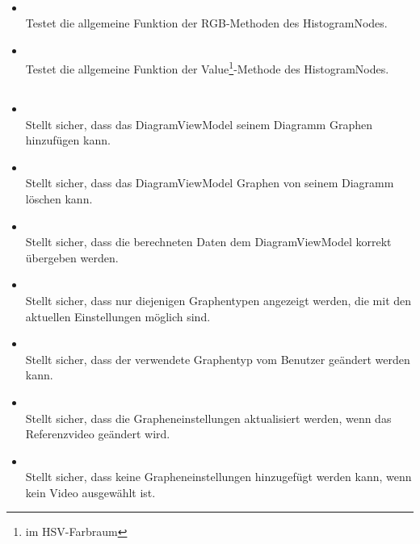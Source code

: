 \paragraph{}
\begin{itemize}
	\item{} \\
		Testet die allgemeine Funktion der RGB-Methoden des HistogramNodes.
	
	\item{} \\
		Testet die allgemeine Funktion der Value\footnote{im HSV-Farbraum}-Methode des HistogramNodes.
\end{itemize}

\subsection{}

\paragraph{}
\begin{itemize}
	\item{} \\
		Stellt sicher, dass das DiagramViewModel seinem Diagramm Graphen hinzufügen kann.
	\item{} \\
		Stellt sicher, dass das DiagramViewModel Graphen von seinem Diagramm löschen kann.
	\item{} \\
		Stellt sicher, dass die berechneten Daten dem DiagramViewModel korrekt übergeben werden.
	\item{} \\
		Stellt sicher, dass nur diejenigen Graphentypen angezeigt werden, die mit den aktuellen Einstellungen möglich sind.
	\item{} \\
		Stellt sicher, dass der verwendete Graphentyp vom Benutzer geändert werden kann.
	\item{} \\
		Stellt sicher, dass die Grapheneinstellungen aktualisiert werden, wenn das Referenzvideo geändert wird.
	\item{} \\
		Stellt sicher, dass keine Grapheneinstellungen hinzugefügt werden kann, wenn kein Video ausgewählt ist.
\end{itemize}


